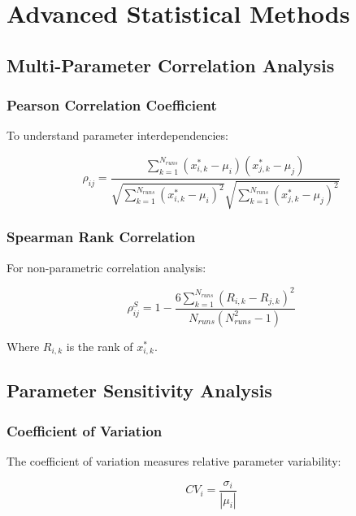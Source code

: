 \documentclass[../main.tex]{subfiles}
\begin{document}
\section{Advanced Statistical Methods}

\subsection{Multi-Parameter Correlation Analysis}

\subsubsection{Pearson Correlation Coefficient}

To understand parameter interdependencies:

\begin{equation}
\rho_{ij} = \frac{\sum_{k=1}^{N_{runs}} (x_{i,k}^* - \mu_i)(x_{j,k}^* - \mu_j)}{\sqrt{\sum_{k=1}^{N_{runs}} (x_{i,k}^* - \mu_i)^2} \sqrt{\sum_{k=1}^{N_{runs}} (x_{j,k}^* - \mu_j)^2}}
\label{eq:pearson_corr}
\end{equation}

\subsubsection{Spearman Rank Correlation}

For non-parametric correlation analysis:

\begin{equation}
\rho_{ij}^S = 1 - \frac{6 \sum_{k=1}^{N_{runs}} (R_{i,k} - R_{j,k})^2}{N_{runs}(N_{runs}^2 - 1)}
\label{eq:spearman_corr}
\end{equation}

Where $R_{i,k}$ is the rank of $x_{i,k}^*$.

\subsection{Parameter Sensitivity Analysis}

\subsubsection{Coefficient of Variation}

The coefficient of variation measures relative parameter variability:

\begin{equation}
CV_i = \frac{\sigma_i}{|\mu_i|}
\label{eq:cv}
\end{equation}
\end{document}
